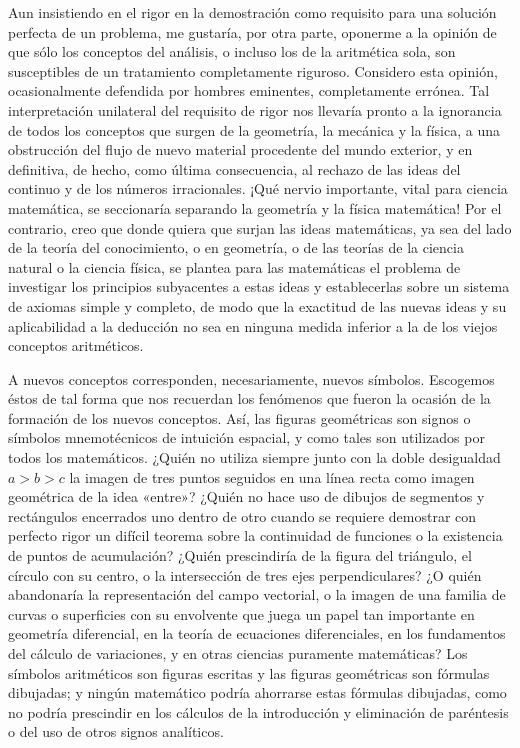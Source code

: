 \documentclass[a4paper, 12pt]{article}
\begin{document}
Aun insistiendo en el rigor en la demostración como requisito para una solución perfecta de un problema, me gustaría, por otra parte, oponerme a la opinión de que sólo los conceptos del análisis, o incluso los de la aritmética sola, son susceptibles de un tratamiento completamente riguroso. Considero esta opinión, ocasionalmente defendida por hombres eminentes, completamente errónea. Tal interpretación unilateral del requisito de rigor nos llevaría pronto a la ignorancia de todos los conceptos que surgen de la geometría, la mecánica y la física, a una obstrucción del flujo de nuevo material procedente del mundo exterior, y en definitiva, de hecho, como última consecuencia, al rechazo de las ideas del continuo y de los números irracionales. ¡Qué nervio importante, vital para ciencia matemática, se seccionaría separando la geometría y la física matemática! Por el contrario, creo que donde quiera que surjan las ideas matemáticas, ya sea del lado de la teoría del conocimiento, o en geometría, o de las teorías de la ciencia natural o la ciencia física, se plantea para las matemáticas el problema de investigar los principios subyacentes a estas ideas y establecerlas sobre un sistema de axiomas simple y completo, de modo que la exactitud de las nuevas ideas y su aplicabilidad a la deducción no sea en ninguna medida inferior a la de los viejos conceptos aritméticos. 

A nuevos conceptos corresponden, necesariamente, nuevos símbolos. Escogemos éstos de tal forma que nos recuerdan los fenómenos que fueron la ocasión de la formación de los nuevos conceptos. Así, las figuras geométricas son signos o símbolos mnemotécnicos de intuición espacial, y como tales son utilizados por todos los matemáticos. ¿Quién no utiliza siempre junto con la doble desigualdad $a > b > c$ la imagen de tres puntos seguidos en una línea recta como imagen geométrica de la idea «entre»? ¿Quién no hace uso de dibujos de segmentos y rectángulos encerrados uno dentro de otro cuando se requiere demostrar con perfecto rigor un difícil teorema sobre la continuidad de funciones o la existencia de puntos de acumulación? ¿Quién prescindiría de la figura del triángulo, el círculo con su centro, o la intersección de tres ejes perpendiculares? ¿O quién abandonaría la representación del campo vectorial, o la imagen de una familia de curvas o superficies con su envolvente que juega un papel tan importante en geometría diferencial, en la teoría de ecuaciones diferenciales, en los fundamentos del cálculo de variaciones, y en otras ciencias puramente matemáticas? Los símbolos aritméticos son figuras escritas y las figuras geométricas son fórmulas dibujadas; y ningún matemático podría ahorrarse estas fórmulas dibujadas, como no podría prescindir en los cálculos de la introducción y eliminación de paréntesis o del uso de otros signos analíticos. 
\end{document}
